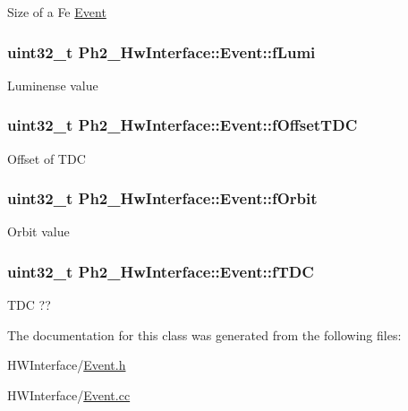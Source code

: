 Size of a Fe \hyperlink{class_ph2___hw_interface_1_1_event}{Event} \hypertarget{class_ph2___hw_interface_1_1_event_a78afd0886560acf70ee6b982c5690e0a}{
\subsubsection[{f\-Lumi}]{\setlength{\rightskip}{0pt plus 5cm}uint32\-\_\-t Ph2\-\_\-\-Hw\-Interface\-::\-Event\-::f\-Lumi\hspace{0.3cm}{\ttfamily [private]}}}\label{class_ph2___hw_interface_1_1_event_a78afd0886560acf70ee6b982c5690e0a}
Luminense value \hypertarget{class_ph2___hw_interface_1_1_event_afd3160b2830469808d9f671bfbedfd55}{
\subsubsection[{f\-Offset\-T\-D\-C}]{\setlength{\rightskip}{0pt plus 5cm}uint32\-\_\-t Ph2\-\_\-\-Hw\-Interface\-::\-Event\-::f\-Offset\-T\-D\-C}}\label{class_ph2___hw_interface_1_1_event_afd3160b2830469808d9f671bfbedfd55}
Offset of T\-D\-C \hypertarget{class_ph2___hw_interface_1_1_event_a6aa6c402d2b16e735fbb4b7518c2666e}{
\subsubsection[{f\-Orbit}]{\setlength{\rightskip}{0pt plus 5cm}uint32\-\_\-t Ph2\-\_\-\-Hw\-Interface\-::\-Event\-::f\-Orbit\hspace{0.3cm}{\ttfamily [private]}}}\label{class_ph2___hw_interface_1_1_event_a6aa6c402d2b16e735fbb4b7518c2666e}
Orbit value \hypertarget{class_ph2___hw_interface_1_1_event_ab91638311238d12f1cd258556c8d1d80}{
\subsubsection[{f\-T\-D\-C}]{\setlength{\rightskip}{0pt plus 5cm}uint32\-\_\-t Ph2\-\_\-\-Hw\-Interface\-::\-Event\-::f\-T\-D\-C\hspace{0.3cm}{\ttfamily [private]}}}\label{class_ph2___hw_interface_1_1_event_ab91638311238d12f1cd258556c8d1d80}
T\-D\-C ?? 

The documentation for this class was generated from the following files\-:\begin{DoxyCompactItemize}
\item 
H\-W\-Interface/\hyperlink{_event_8h}{Event.\-h}\item 
H\-W\-Interface/\hyperlink{_event_8cc}{Event.\-cc}\end{DoxyCompactItemize}
